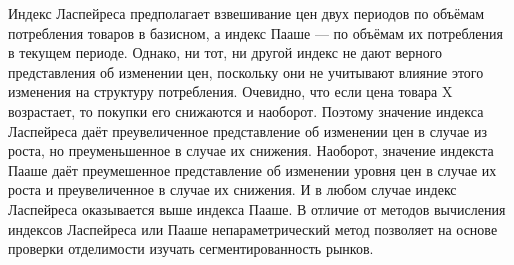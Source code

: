 \documentclass[12pt]{article}
\theoremstyle{rusdef}
\begin{document}
Индекс Ласпейреса предполагает взвешивание цен двух периодов по объёмам потребления товаров в базисном, а индекс Пааше --- по объёмам их потребления в текущем периоде. Однако, ни тот, ни другой индекс не дают верного представления об изменении цен, поскольку они не учитывают влияние этого изменения на структуру потребления. Очевидно, что если цена товара X возрастает, то покупки его снижаются и наоборот. Поэтому значение индекса Ласпейреса даёт преувеличенное представление об изменении цен в случае из роста, но преуменьшенное в случае их снижения. Наоборот, значение индекста Пааше даёт преумешенное представление об изменении уровня цен в случае их роста и преувеличенное в случае их снижения. И в любом случае индекс Ласпейреса оказывается выше индекса Пааше. В отличие от методов вычисления индексов Ласпейреса или Пааше непараметрический метод позволяет на основе проверки отделимости изучать сегментированность рынков.
\end{document}
